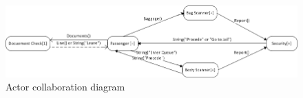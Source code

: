 \documentclass[12pt,letterpaper]{scrartcl}
\begin{document}
\begin{figure}[ht]
\centering
\includegraphics[width=\textwidth]{actorCollabDiagram.png}
\caption{Actor collaboration diagram}
\end{figure}
\end{document}
